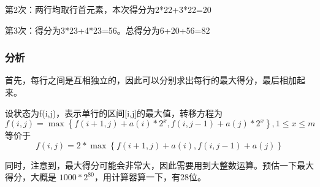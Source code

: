 第2次：两行均取行首元素，本次得分为2*22+3*22=20

第3次：得分为3*23+4*23=56。总得分为6+20+56=82


\subsubsection{分析}
首先，每行之间是互相独立的，因此可以分别求出每行的最大得分，最后相加起来。

设状态为f(i,j)，表示单行的区间[i,j]的最大值，转移方程为
$$
f(i,j) = \max\left\{f(i+1,j)+a(i)*2^x, f(i,j-1)+a(j)*2^x\right\}, 1 \leq x \leq m
$$
等价于
$$
f(i,j) = 2*\max\left\{f(i+1,j)+a(i), f(i,j-1)+a(j)\right\}
$$

同时，注意到，最大得分可能会非常大，因此需要用到大整数运算。预估一下最大得分，大概是 $1000*2^{80}$，用计算器算一下，有28位。

